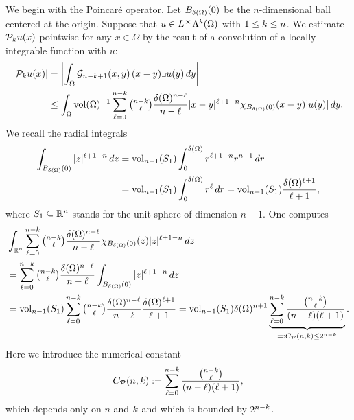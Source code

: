 \documentclass[10pt,a4paper]{article}
\begin{document}
We begin with the Poincar\'e operator. 
Let $B_{{\delta}(\Omega)}(0)$ be the $n$-dimensional ball centered at the origin.
Suppose that $u \in L^{\infty}\Lambda^{k}(\Omega)$ with $1 \leq k \leq n$.
We estimate ${\mathcal P}_{k} u(x)$ pointwise for any $x \in \Omega$ by the result of a convolution of a locally integrable function with $u$:
\begin{align*}
    \left| {\mathcal P}_{k} u(x) \right|
    &=
    \left| 
        \int_{\Omega} {\mathcal G}_{n-k+1}(x,y) \,(x-y)\lrcorner u(y)\,dy
    \right| 
    \\&\leq 
    \int_{\Omega} \operatorname{vol}(\Omega)^{-1} \sum_{\ell=0}^{ n-k }\tbinom{ n-k }{\ell} \frac{ {\delta}(\Omega)^{n-\ell} }{n-\ell} |x-y|^{\ell+1-n} \chi_{B_{{\delta}(\Omega)}(0)}(x-y) |u(y)| \,dy
    .
\end{align*}
We recall the radial integrals 
\begin{align*}
    \int_{B_{{\delta}(\Omega)}(0)} |z|^{\ell+1-n} \,dz
    &
    =
    \operatorname{vol}_{n-1}(S_1) \int_{0}^{{\delta}(\Omega)} r^{\ell+1-n} r^{n-1} \,dr
    \\&
    =
    \operatorname{vol}_{n-1}(S_1) \int_{0}^{{\delta}(\Omega)} r^{\ell} \,dr
    =
    \operatorname{vol}_{n-1}(S_1) \frac{{\delta}(\Omega)^{\ell+1}}{\ell+1}
    ,
\end{align*}
where $S_1 \subseteq {\mathbb R}^{n}$ stands for the unit sphere of dimension $n-1$. 
One computes 
\begin{align*}
    &
    \int_{{\mathbb R}^{n}} \sum_{\ell=0}^{n-k} \tbinom{n-k}{\ell} \frac{ {\delta}(\Omega)^{n-\ell} }{n-\ell} \chi_{B_{{\delta}(\Omega)}(0)}(z) |z|^{\ell+1-n} \,dz
    \\&
    =
    \sum_{\ell=0}^{n-k} \tbinom{n-k}{\ell} \frac{ {\delta}(\Omega)^{n-\ell} }{n-\ell} \int_{B_{{\delta}(\Omega)}(0)} |z|^{\ell+1-n} \,dz
    \\&
    =
    \operatorname{vol}_{n-1}(S_1) \sum_{\ell=0}^{n-k} \tbinom{n-k}{\ell} \frac{ {\delta}(\Omega)^{n-\ell} }{n-\ell} \frac{{\delta}(\Omega)^{\ell+1}}{\ell+1}
    =
    \operatorname{vol}_{n-1}(S_1) {\delta}(\Omega)^{n+1} \underbrace{ \sum_{\ell=0}^{n-k} \frac{ \tbinom{n-k}{\ell} }{ (n-\ell)(\ell+1) } }_{ =: C_{{\mathcal P}}(n,k) \leq 2^{n-k}}
    .
\end{align*}
Here we introduce the numerical constant 
\begin{gather}\label{equation:A_Poinc}
    C_{{\mathcal P}}(n,k) := \sum_{\ell=0}^{n-k} \frac{ \tbinom{n-k}{\ell} }{ (n-\ell)(\ell+1) },
\end{gather}
which depends only on $n$ and $k$ and which is bounded by $2^{n-k}$. 
\end{document}
